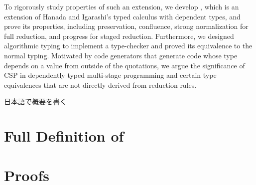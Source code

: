 \documentclass[master,english]{kuisthesis}
\begin{document}
\begin{eabstract}
    To rigorously study properties of such an extension, we develop \LMD, which
    is an extension of Hanada and Igarashi's typed calculus \LTP with dependent
    types, and prove its properties, including preservation, confluence, strong
    normalization for full reduction, and progress for staged reduction.
    Furthermore, we designed algorithmic typing to implement a type-checker and
    proved its equivalence to the normal typing. Motivated by code generators
    that generate code whose type depends on a value from outside of the
    quotations, we argue the significance of CSP in
    dependently typed multi-stage programming and certain type equivalences
    that are not directly derived from reduction rules. 

\end{eabstract}

\begin{jabstract}				%
日本語で概要を書く
\end{jabstract}

\tableofcontents				%


















\iffullversion
\appendix

\newtheorem{dfn}{Definition}
\newtheorem{ex}{Example}
\newtheorem{cm}{Comment}
\newcommand{\figheader}[2]{
  \begin{flushleft}
    #2 {\bf \normalsize #1}
\end{flushleft}}

\newpage
\section{Full Definition of \LMD}


\section{Proofs}


\fi
\end{document}
